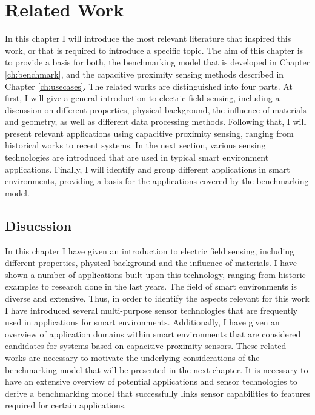 \chapter{Related Work}
\label{ch:related_work}
In this chapter I will introduce the most relevant literature that inspired this work, or that is required to introduce a specific topic. The aim of this chapter is to provide a basis for both, the benchmarking model that is developed in Chapter \ref{ch:benchmark}, and the capacitive proximity sensing methods described in Chapter \ref{ch:usecases}. The related works are distinguished into four parts. At first, I will give a general introduction to electric field sensing, including a discussion on different properties, physical background, the influence of materials and geometry, as well as different data processing methods. Following that, I will  present relevant applications using capacitive proximity sensing, ranging from historical works to recent systems. In the next section, various sensing technologies are introduced that are used in typical smart environment applications. Finally, I will identify and group different applications in smart environments, providing a basis for the applications covered by the benchmarking model.





\section{Disucssion}
In this chapter I have given an introduction to electric field sensing, including different properties, physical background and the influence of materials. I have shown a number of applications built upon this technology, ranging from historic examples to research done in the last years. The field of smart environments is diverse and extensive. Thus, in order to identify the aspects relevant for this work I have introduced several multi-purpose sensor technologies that are frequently used in applications for smart environments. Additionally, I have given an overview of application domains within smart environments that are considered candidates for systems based on capacitive proximity sensors. These related works are necessary to motivate the underlying considerations of the benchmarking model that will be presented in the next chapter. It is necessary to have an extensive overview of potential applications and sensor technologies to derive a benchmarking model that successfully links sensor capabilities to features required for certain applications. 
